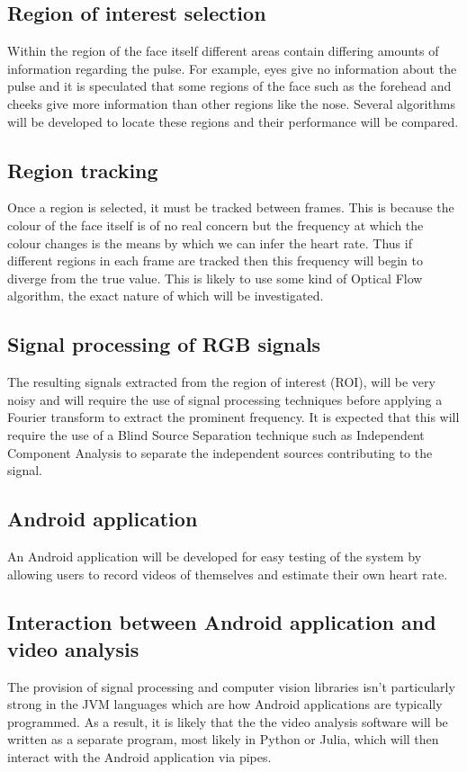 \documentclass{article}
\begin{document}
\subsection*{Region of interest selection}
Within the region of the face itself different areas contain differing amounts of information regarding the pulse. For example, eyes give no information about the pulse and it is speculated that some regions of the face such as the forehead and cheeks give more information than other regions like the nose. Several algorithms will be developed to locate these regions and their performance will be compared.

\subsection*{Region tracking}
Once a region is selected, it must be tracked between frames. This is because the colour of the face itself is of no real concern but the frequency at which the colour changes is the means by which we can infer the heart rate. Thus if different regions in each frame are tracked then this frequency will begin to diverge from the true value. This is likely to use some kind of Optical Flow algorithm, the exact nature of which will be investigated.

\subsection*{Signal processing of RGB signals}
The resulting signals extracted from the region of interest (ROI), will be very noisy and will require the use of signal processing techniques before applying a Fourier transform to extract the prominent frequency. It is expected that this will require the use of a Blind Source Separation technique such as Independent Component Analysis to separate the independent sources contributing to the signal.

\subsection*{Android application}
An Android application will be developed for easy testing of the system by allowing users to record videos of themselves and estimate their own heart rate.

\subsection*{Interaction between Android application and video analysis}
The provision of signal processing and computer vision libraries isn’t particularly strong in the JVM languages which are how Android applications are typically programmed. As a result, it is likely that the the video analysis software will be written as a separate program, most likely in Python or Julia, which will then interact with the Android application via pipes. 
\end{document}
